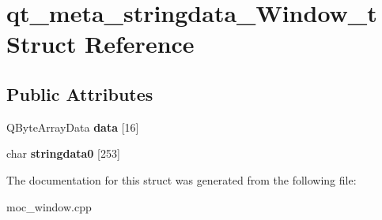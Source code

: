 \hypertarget{structqt__meta__stringdata__Window__t}{}\section{qt\+\_\+meta\+\_\+stringdata\+\_\+\+Window\+\_\+t Struct Reference}
\label{structqt__meta__stringdata__Window__t}
\subsection*{Public Attributes}
\begin{DoxyCompactItemize}
\item 
\mbox{\label{structqt__meta__stringdata__Window__t_a076b177ed636b65403e0eba20560411f}} 
Q\+Byte\+Array\+Data {\bfseries data} \mbox{[}16\mbox{]}
\item 
\mbox{\label{structqt__meta__stringdata__Window__t_ab5d3eb36d88a0a9c0e2efcd7d70462a5}} 
char {\bfseries stringdata0} \mbox{[}253\mbox{]}
\end{DoxyCompactItemize}


The documentation for this struct was generated from the following file\+:\begin{DoxyCompactItemize}
\item 
moc\+\_\+window.\+cpp\end{DoxyCompactItemize}
